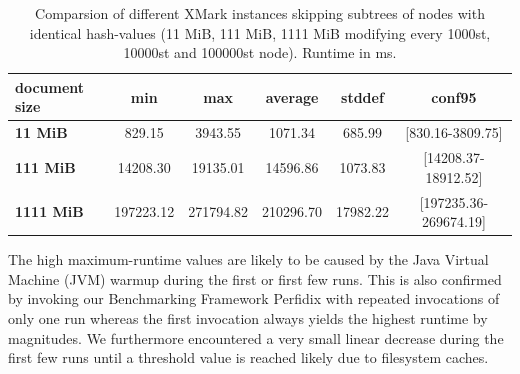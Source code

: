 \begin{table}[tb]
\centering 
\begin{tabular}[r]{|l|c|c|c|c|c|} 
\hline
\textbf{document size} & \textbf{min} & \textbf{max} & \textbf{average} & \textbf{stddef} & \textbf{conf95}\\
\hline
\hline
\textbf{11 MiB} & 829.15 & 3943.55 & 1071.34 & 685.99 & [830.16-3809.75] \\
\hline
\textbf{111 MiB} & 14208.30 & 19135.01 & 14596.86 & 1073.83 & [14208.37-18912.52]\\
\hline
\textbf{1111 MiB} & 197223.12  & 271794.82 & 210296.70 & 17982.22 & [197235.36-269674.19]\\
\hline
\end{tabular}
\label{chap3:compPrunedDiffInstances}
\vspace{0.5em} 
\caption{Comparsion of different XMark instances skipping subtrees of nodes with identical hash-values (11 MiB, 111 MiB, 1111 MiB modifying every 1000st, 10000st and 100000st node). Runtime in ms.}
\end{table}


The high maximum-runtime values are likely to be caused by the Java Virtual Machine (JVM) warmup during the first or first few runs. This is also confirmed by invoking our Benchmarking Framework Perfidix with repeated invocations of only one run whereas the first invocation always yields the highest runtime by magnitudes. We furthermore encountered a very small linear decrease during the first few runs until a threshold value is reached likely due to filesystem caches.

